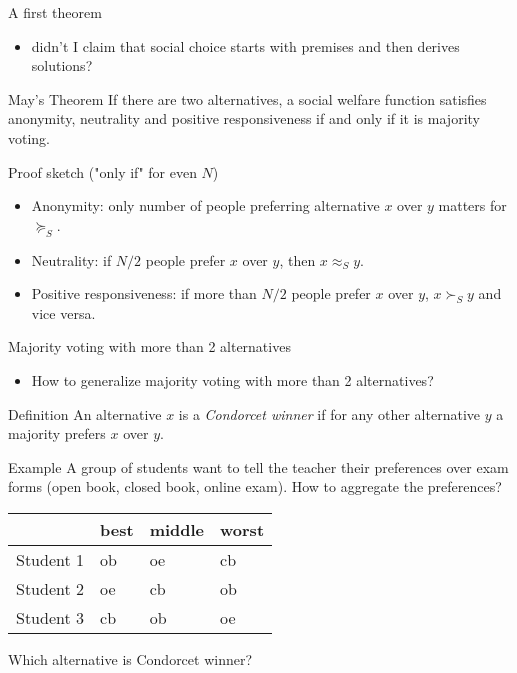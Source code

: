 \documentclass[bigger]{beamer}
\begin{document}
\begin{frame}[label={sec:org58e187d}]{A first theorem}
\begin{itemize}
\item didn't I claim that social choice starts with premises and then derives solutions?
\end{itemize}

\begin{block}{May's Theorem}
If there are two alternatives, a social welfare function satisfies anonymity, neutrality and positive responsiveness if and only if it is majority voting. 
\end{block}
\begin{block}{Proof sketch ("only if" for even \(N\))}
\begin{itemize}
\item Anonymity: only number of people preferring alternative \(x\) over \(y\) matters for \(\succeq_S\).
\item Neutrality: if \(N/2\) people prefer \(x\) over \(y\), then \(x\approx_S y\).
\item Positive responsiveness: if more than \(N/2\) people prefer \(x\) over \(y\), \(x\succ_S y\) and vice versa.
\end{itemize}
\end{block}
\end{frame}
\begin{frame}[label={sec:orgda31ac1}]{Majority voting with more than 2 alternatives}
\begin{itemize}
\item How to generalize majority voting with more than 2 alternatives?
\end{itemize}
\begin{block}{Definition}
An alternative \(x\) is a \emph{Condorcet winner} if for any other alternative \(y\) a majority prefers \(x\) over \(y\).
\end{block}
\begin{block}{Example}
A group of students want to tell the teacher their preferences over exam forms (open book, closed book, online exam). How to aggregate the preferences?
\begin{center}
\begin{tabular}{l|lll}
 & best & middle & worst\\
\hline
Student 1 & ob & oe & cb\\
Student 2 & oe & cb & ob\\
Student 3 & cb & ob & oe\\
\end{tabular}
\end{center}
Which alternative is Condorcet winner?
\end{block}
\end{frame}
\end{document}
